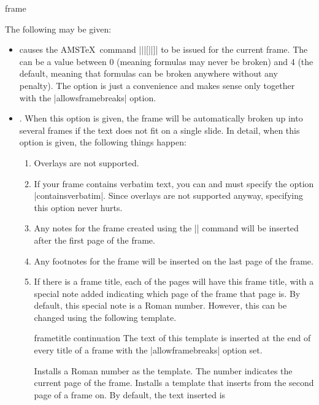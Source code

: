 \begin{environment}{{frame}%
    }
\begin{frame}[<+->][plain]
\begin{frame}[plain]
  The following  may be given:
  \begin{itemize}
  \item
     causes the AMS\TeX\ command
    |\allowdisplaybreaks||[||]| to be issued
    for the current frame. The  can be a
    value between 0 (meaning formulas may never be broken) and 4 (the
    default, meaning that formulas can be broken anywhere without any
    penalty). The option is just a convenience and makes sense only
    together with the |allowsframebreaks| option.  
  \item
    . When this option is
    given, the frame will be automatically broken up into several
    frames if the text does not fit on a single slide. In detail, when this
    option is given, the following things happen:
    \begin{enumerate}
    \item
      Overlays are not supported.
    \item
      If your frame contains verbatim text, you can and must specify the
      option |containsverbatim|. Since overlays are not supported
      anyway, specifying this option never hurts.
    \item
      Any notes for the frame created using the |\note| command will
      be inserted after the first page of the frame.
    \item
      Any footnotes for the frame will be inserted on the last page of
      the frame.
    \item
      If there is a frame title, each of the pages will have this
      frame title, with a special note added indicating which page of
      the frame that page is. By default, this special note is a
      Roman number. However, this can be changed using the following
      template.
      \begin{template*}{frametitle continuation}
        The text of this template is inserted at the end of every
        title of a frame with the |allowframebreaks| option set.
        \begin{templateoptions}
          Installs a Roman number as the template. The number
          indicates the current page of the frame.
          Installs a template that inserts  from the second
          page of a frame on. By default, the text inserted is

\end{templateoptions}
\end{template*}
\end{enumerate}
\end{itemize}
\end{frame}
\end{frame}
\end{environment}
